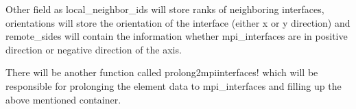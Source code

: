 \documentclass[12pt]{article}
\begin{document}
Other field as {\ttfamily local\_neighbor\_ids} will store {\ttfamily ranks} of neighboring interfaces, {\ttfamily orientations} will store the orientation of the interface (either x or y direction)
and {\ttfamily remote\_sides} will contain the information whether {\ttfamily mpi\_interfaces} are in positive direction or negative direction of the axis.

There will be another function called {\ttfamily prolong2mpiinterfaces!} which will be responsible for prolonging the element data to {\ttfamily mpi\_interfaces} and filling up the above mentioned
container.
\end{document}
